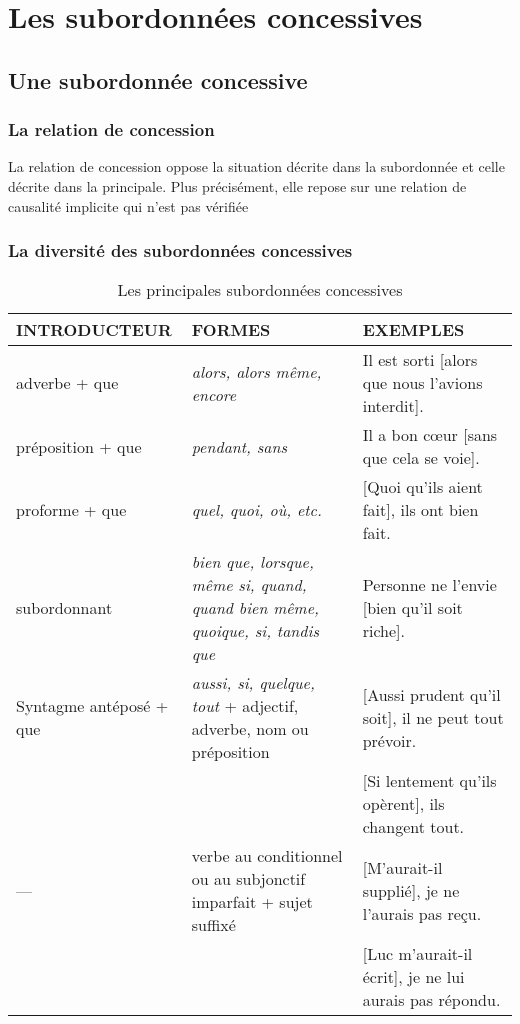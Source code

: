 \documentclass[UTF8]{report}
\begin{document}
\section{Les subordonnées concessives}
\subsection{Une subordonnée concessive}
\subsubsection{La relation de concession}
La relation de concession oppose la situation décrite dans la subordonnée et celle décrite dans la principale. Plus précisément, elle repose sur une relation de causalité implicite qui n’est pas vérifiée

\subsubsection{La diversité des subordonnées concessives}

\begin{table}[H]
    \centering
    \small
    
    \begin{adjustbox}{max width =\textwidth}
        \begin{tabular}{|p{3cm}|p{6cm}|p{6cm}|}
        \hline
        \rowcolor{cyan!20}
        \textbf{INTRODUCTEUR} & \textbf{FORMES} & \textbf{EXEMPLES} \\
        \hline
        adverbe + que & \textit{alors, alors même, encore} & Il est sorti [alors que nous l'avions interdit]. \\
        \hline
        préposition + que & \textit{pendant, sans} & Il a bon cœur [sans que cela se voie]. \\
        \hline
        proforme + que & \textit{quel, quoi, où, etc.} & [Quoi qu'ils aient fait], ils ont bien fait. \\
        \hline
        subordonnant & \textit{bien que, lorsque, même si, quand, quand bien même, quoique, si, tandis que} & Personne ne l'envie [bien qu'il soit riche]. \\
        \hline
        Syntagme antéposé + que & \textit{aussi, si, quelque, tout} + adjectif, adverbe, nom ou préposition & [Aussi prudent qu'il soit], il ne peut tout prévoir. \\
        & & [Si lentement qu'ils opèrent], ils changent tout. \\
        \hline
        --- & verbe au conditionnel ou au subjonctif imparfait + sujet suffixé & [M'aurait-il supplié], je ne l'aurais pas reçu. \\
        & & [Luc m'aurait-il écrit], je ne lui aurais pas répondu. \\
        \hline
        \end{tabular}
    \end{adjustbox}
    \caption{Les principales subordonnées concessives}
\end{table}
\end{document}
